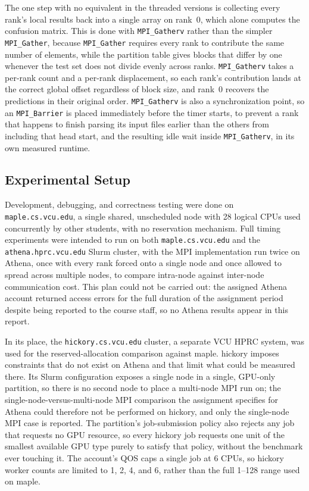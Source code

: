 \documentclass[conference]{IEEEtran}
\begin{document}
The one step with no equivalent in the threaded versions is collecting
every rank's local results back into a single array on rank~0, which alone
computes the confusion matrix. This is done with \texttt{MPI\_Gatherv}
rather than the simpler \texttt{MPI\_Gather}, because \texttt{MPI\_Gather}
requires every rank to contribute the same number of elements, while the
partition table gives blocks that differ by one whenever the test set does
not divide evenly across ranks. \texttt{MPI\_Gatherv} takes a per-rank
count and a per-rank displacement, so each rank's contribution lands at
the correct global offset regardless of block size, and rank~0 recovers
the predictions in their original order. \texttt{MPI\_Gatherv} is also a
synchronization point, so an \texttt{MPI\_Barrier} is placed immediately
before the timer starts, to prevent a rank that happens to finish parsing
its input files earlier than the others from including that head start,
and the resulting idle wait inside \texttt{MPI\_Gatherv}, in its own
measured runtime.

\subsection{Experimental Setup}

Development, debugging, and correctness testing were done on
\texttt{maple.cs.vcu.edu}, a single shared, unscheduled node with 28 logical
CPUs used concurrently by other students, with no reservation mechanism.
Full timing experiments were intended to run on both \texttt{maple.cs.vcu.edu}
and the \texttt{athena.hprc.vcu.edu} Slurm cluster, with the MPI
implementation run twice on Athena, once with every rank forced onto a
single node and once allowed to spread across multiple nodes, to compare
intra-node against inter-node communication cost. This plan could not be
carried out: the assigned Athena account returned access errors for the
full duration of the assignment period despite being reported to the course
staff, so no Athena results appear in this report.

In its place, the \texttt{hickory.cs.vcu.edu} cluster, a separate VCU HPRC
system, was used for the reserved-allocation comparison against maple.
hickory imposes constraints that do not exist on Athena and that limit what
could be measured there. Its Slurm configuration exposes a single node in a
single, GPU-only partition, so there is no second node to place a
multi-node MPI run on; the single-node-versus-multi-node MPI comparison the
assignment specifies for Athena could therefore not be performed on
hickory, and only the single-node MPI case is reported. The partition's
job-submission policy also rejects any job that requests no GPU resource,
so every hickory job requests one unit of the smallest available GPU type
purely to satisfy that policy, without the benchmark ever touching it. The
account's QOS caps a single job at 6 CPUs, so hickory worker counts are
limited to 1, 2, 4, and 6, rather than the full 1--128 range used on maple.
\end{document}
